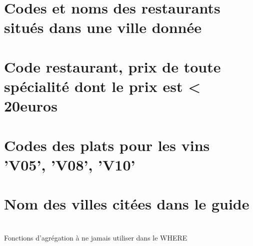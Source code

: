\documentclass{article}
\begin{document}
	\maketitle
	\section{Codes et noms des restaurants situés dans une ville donnée}
		
	\section{Code restaurant, prix de toute spécialité dont le prix est < 20euros}
		
	\section{Codes des plats pour les vins 'V05', 'V08', 'V10'}
		
	\section{Nom des villes citées dans le guide}
		
	\newpage
	\section{}
		
	\section{}
		
	\section{}
		
	\newpage
	\section{}
		
	\section{}
		
	Fonctions d'agrégation à ne jamais utiliser dans le WHERE 
	\section{}
		
	
\end{document}
